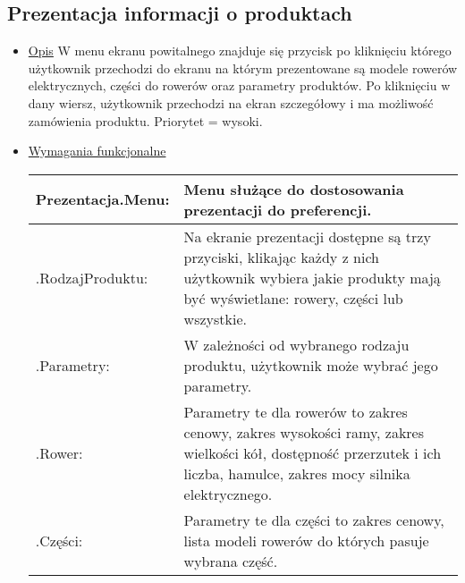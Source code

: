 \documentclass[a4paper,20pt]{article}
\begin{document}
\subsection{Prezentacja informacji o produktach}

\begin{itemize}
\item \underline{Opis} 
\newline
\newline
W menu ekranu powitalnego znajduje się przycisk po kliknięciu którego użytkownik przechodzi do ekranu na którym prezentowane są modele rowerów elektrycznych, części do rowerów oraz parametry produktów. Po kliknięciu w dany wiersz, użytkownik przechodzi na ekran szczegółowy i ma możliwość zamówienia produktu. Priorytet = wysoki.
\newline

\item \underline{Wymagania funkcjonalne}

\begin{center}
\begin{tabularx}{\textwidth}[t]{XX}


\arrayrulecolor{black}\hline
\textbf{Prezentacja.Menu:} & \textbf{Menu służące do dostosowania prezentacji do preferencji.} \\

\hline

\quad .RodzajProduktu: & 
\begin{minipage}[t]{\linewidth}%
Na ekranie prezentacji dostępne są trzy przyciski, klikając każdy z nich użytkownik wybiera jakie produkty mają być wyświetlane: rowery, części lub wszystkie.   
\end{minipage}\\

\quad .Parametry: & 
\begin{minipage}[t]{\linewidth}%
W zależności od wybranego rodzaju produktu, użytkownik może wybrać jego parametry.
\end{minipage}\\

\quad \quad .Rower: & 
\begin{minipage}[t]{\linewidth}%
Parametry te dla rowerów to zakres cenowy, zakres wysokości ramy, zakres wielkości kół, dostępność przerzutek i ich liczba, hamulce, zakres mocy silnika elektrycznego.    
\end{minipage}\\

\quad \quad .Części: & 
\begin{minipage}[t]{\linewidth}%
Parametry te dla części to zakres cenowy, lista modeli rowerów do których pasuje wybrana część.
\end{minipage}\\


\end{tabularx}
\end{center}
\end{itemize}
\end{document}
